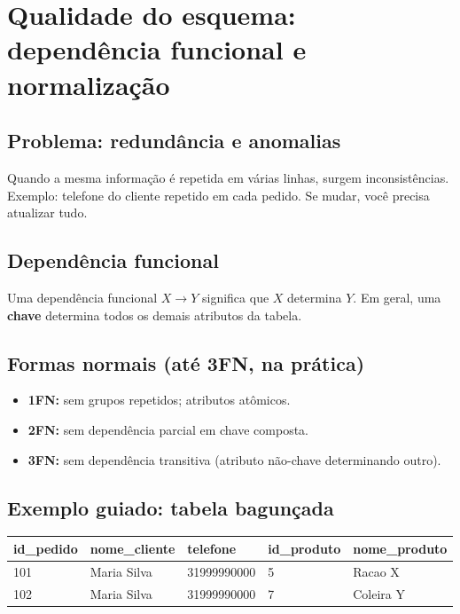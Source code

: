 \documentclass[12pt,a4paper]{article}
\begin{document}
\section{Qualidade do esquema: dependência funcional e normalização}

\subsection{Problema: redundância e anomalias}
Quando a mesma informação é repetida em várias linhas, surgem inconsistências. Exemplo: telefone do cliente repetido em cada pedido. Se mudar, você precisa atualizar tudo.

\subsection{Dependência funcional}
Uma dependência funcional $X \rightarrow Y$ significa que $X$ determina $Y$. Em geral, uma \textbf{chave} determina todos os demais atributos da tabela.

\subsection{Formas normais (até 3FN, na prática)}
\begin{itemize}[leftmargin=*,itemsep=0.2em]
  \item \textbf{1FN:} sem grupos repetidos; atributos atômicos.
  \item \textbf{2FN:} sem dependência parcial em chave composta.
  \item \textbf{3FN:} sem dependência transitiva (atributo não-chave determinando outro).
\end{itemize}

\subsection{Exemplo guiado: tabela bagunçada}
\begin{center}
\begin{tabular}{@{}lllll@{}}
\toprule
id\_pedido & nome\_cliente & telefone & id\_produto & nome\_produto \\
\midrule
101 & Maria Silva & 31999990000 & 5 & Racao X \\
102 & Maria Silva & 31999990000 & 7 & Coleira Y \\
\bottomrule
\end{tabular}
\end{center}
\end{document}
